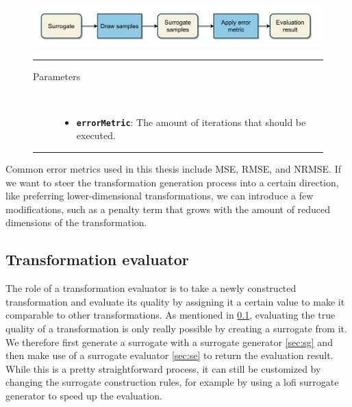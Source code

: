 \documentclass[
  a4paper,  %
  twoside,  %
  bibliography=totoc,
  headsepline,
  cleardoublepage=empty,
  parskip=half,
  draft=false
]{scrbook}
\newcommand{\delimit}{{\color{charcoal}\noindent\rule{\textwidth}{1pt}}}
\begin{document}
\begin{mdframed}[style=style,frametitle={Surrogate evaluator}]
\begin{figure}[H]
\includegraphics[width=\textwidth]{graphics/SurrogateEval.pdf}
\vspace{-4.5mm}

\delimit

\begin{description}
\item[Parameters] {~ \begin{itemize}[\indent{}]
\item \texttt{\textbf{errorMetric}}: The amount of iterations that should be executed.
\end{itemize}}
\end{description}

\delimit

\label{fig:se}
\end{figure}
\end{mdframed}

Common error metrics used in this thesis include MSE, RMSE, and NRMSE.
If we want to steer the transformation generation process into a certain direction, like preferring lower-dimensional transformations, we can introduce a few modifications, such as a penalty term that grows with the amount of reduced dimensions of the transformation.

\subsection {Transformation evaluator}
\label{sec:te}

The role of a transformation evaluator is to take a newly constructed transformation and evaluate its quality by assigning it a certain value to make it comparable to other transformations.
As mentioned in \cref{sec:te}, evaluating the true quality of a transformation is only really possible by creating a surrogate from it.
We therefore first generate a surrogate with a surrogate generator \cref{sec:sg} and then make use of a surrogate evaluator \cref{sec:se} to return the evaluation result.
While this is a pretty straightforward process, it can still be customized by changing the surrogate construction rules, for example by using a lofi surrogate generator to speed up the evaluation.
\end{document}
